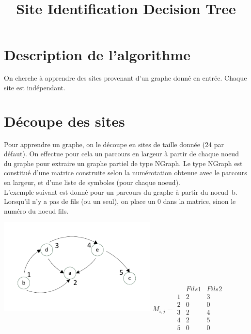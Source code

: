 \documentclass[a4paper,10pt]{article}
\title{Site Identification Decision Tree}
\date{}
\begin{document}
\maketitle

\section{Description de l'algorithme}
On cherche à apprendre des sites provenant d'un graphe donné en entrée. Chaque site est indépendant.

\section{Découpe des sites}
Pour apprendre un graphe, on le découpe en sites de taille donnée (24 par défaut).
On effectue pour cela un parcours en largeur à partir de chaque noeud du graphe pour extraire un graphe partiel de type NGraph. Le type NGraph est constitué d'une matrice construite selon la numérotation obtenue avec le parcours en largeur, et d'une liste de symboles (pour chaque noeud).\\

L'exemple suivant est donné pour un parcours du graphe à partir du noeud~b. Lorsqu'il n'y a pas de fils (ou un seul), on place un 0 dans la matrice, sinon le numéro du noeud fils.

\includegraphics[width=0.60\textwidth]{src/img/graphesBFS5.pdf}
$M_{i, j} = \begin{array}{r|cc}  & Fils 1 & Fils 2 \\
\hline
1 & 2 & 3\\
2 & 0 & 0\\
3 & 2 & 4\\ 
4 & 2 & 5\\ 
5 & 0 & 0\\ 
\end{array}$\\
\end{document}
